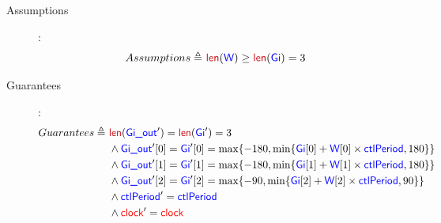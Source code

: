 \documentclass[fleqn,a4paper]{article}
\newcommand\Var[1]{\textcolor{blue}{\textsf{#1}}}
\newcommand\syntax[1]{\textcolor[RGB]{202,12,22}{\textsf{#1}}}
\newcommand\clock{\textcolor{red}{\textsf{clock}}}
\newcommand\definedby{\triangleq}
\begin{document}
\begin{description}
\item[Assumptions]:
\begin{align*}
Assumptions \definedby \
& \syntax{len}(\Var{W}) \geq \syntax{len}(\Var{Gi}) = 3
\end{align*}

\item[Guarantees]:
\begin{align*}
Guarantees \definedby \
& \syntax{len}(\Var{Gi\_out}') = \syntax{len}(\Var{Gi}') = 3 \\
& \wedge \Var{Gi\_out}'[0] = \Var{Gi}'[0] = \max\{-180, \min\{\Var{Gi}[0] + \Var{W}[0] \times \Var{ctlPeriod}, 180\}\} \\
& \wedge \Var{Gi\_out}'[1] = \Var{Gi}'[1] = \max\{-180, \min\{\Var{Gi}[1] + \Var{W}[1] \times \Var{ctlPeriod}, 180\}\} \\
& \wedge \Var{Gi\_out}'[2] = \Var{Gi}'[2] = \max\{-90,  \min\{\Var{Gi}[2] + \Var{W}[2] \times \Var{ctlPeriod}, 90\} \} \\
& \wedge \Var{ctlPeriod}' = \Var{ctlPeriod} \\
& \wedge \clock' = \clock
\end{align*}

\end{description}
\end{document}
